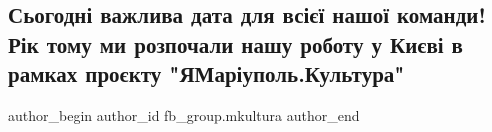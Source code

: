  
 
 
 
 

\subsection{Сьогодні важлива дата для всієї нашої команди! Рік тому ми розпочали нашу роботу у Києві в рамках проєкту "ЯМаріуполь.Культура"}
\label{sec:21_06_2023.fb.fb_group.mkultura.1.nasha_robota_v_kyevi_ja_mariupol_kultura}

\ifcmt
 author_begin
   author_id fb_group.mkultura
 author_end
\fi
